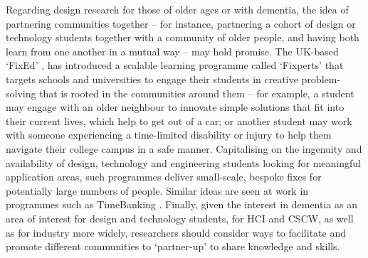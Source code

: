 Regarding design research for those of older ages or with dementia, the idea of partnering communities together – for instance, partnering a cohort of design or technology students together with a community of older people, and having both learn from one another in a mutual way – may hold promise. The UK-based ‘FixEd’ \citep{noauthor_fixperts_nodate}, has introduced a scalable learning programme called `Fixperts' that targets schools and universities to engage their students in creative problem-solving that is rooted in the communities around them – for example, a student may engage with an older neighbour to innovate simple solutions that fit into their current lives, which help to get out of a car; or another student may work with someone experiencing a time-limited disability or injury to help them navigate their college campus in a safe manner. Capitalising on the ingenuity and availability of design, technology and engineering students looking for meaningful application areas, such programmes deliver small-scale, bespoke fixes for potentially large numbers of people. Similar ideas are seen at work in programmes such as TimeBanking \citep{noauthor_hour_nodate}. Finally, given the interest in dementia as an area of interest for design and technology students, for HCI and CSCW, as well as for industry more widely, researchers should consider ways to facilitate and promote different communities to ‘partner-up’ to share knowledge and skills. 

